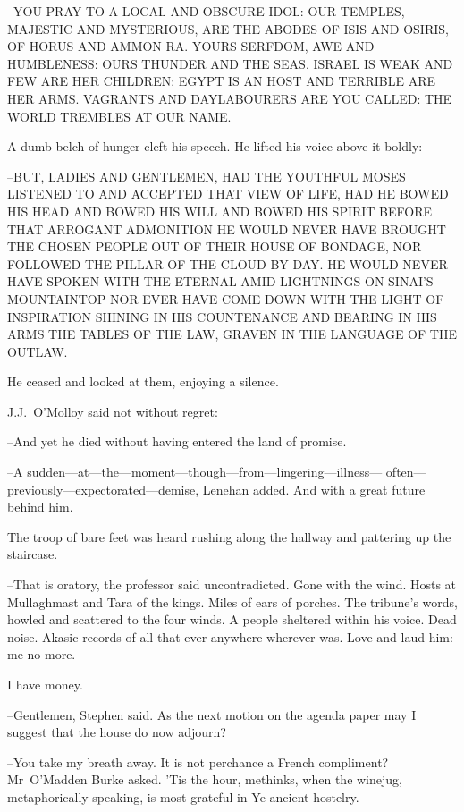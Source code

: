 --YOU PRAY TO A LOCAL AND OBSCURE IDOL:
OUR TEMPLES,
MAJESTIC AND MYSTERIOUS,
ARE THE ABODES OF ISIS AND OSIRIS,
OF HORUS AND AMMON RA.
YOURS SERFDOM, AWE AND HUMBLENESS:
OURS THUNDER AND THE SEAS.
ISRAEL IS WEAK AND FEW ARE HER CHILDREN:
EGYPT IS AN HOST AND TERRIBLE ARE HER ARMS.
VAGRANTS AND DAYLABOURERS ARE YOU CALLED:
THE WORLD TREMBLES AT OUR NAME.

A dumb belch of hunger cleft his speech.
He lifted his voice above it boldly:

--BUT, LADIES AND GENTLEMEN,
HAD THE YOUTHFUL MOSES LISTENED TO AND ACCEPTED THAT VIEW OF LIFE,
HAD HE BOWED HIS HEAD AND BOWED HIS WILL AND
BOWED HIS SPIRIT BEFORE THAT ARROGANT ADMONITION
HE WOULD NEVER HAVE BROUGHT THE CHOSEN PEOPLE OUT OF THEIR HOUSE OF BONDAGE,
NOR FOLLOWED THE PILLAR OF THE CLOUD BY DAY.
HE WOULD NEVER HAVE SPOKEN WITH THE ETERNAL
AMID LIGHTNINGS ON SINAI'S MOUNTAINTOP
NOR EVER HAVE COME DOWN WITH THE LIGHT OF INSPIRATION SHINING IN HIS COUNTENANCE
AND BEARING IN HIS ARMS THE TABLES OF THE LAW,
GRAVEN IN THE LANGUAGE OF THE OUTLAW.

He ceased and looked at them, enjoying a silence.



J.J.~O'Molloy said
not without regret:

--And yet he died
without having entered the land of promise.

--A sudden---at---the---moment---though---from---lingering---illness---%
often---previously---expectorated---demise,
Lenehan added.
And with a great future behind him.

The troop of bare feet was heard rushing along the hallway
and pattering up the staircase.

--That is oratory,
the professor said uncontradicted.
Gone with the wind.
Hosts at Mullaghmast and Tara of the kings.
Miles of ears of porches.
The tribune's words,
howled and scattered to the four winds.
A people sheltered within his voice.
Dead noise.
Akasic records of all that ever anywhere wherever was.
Love and laud him: me no more.

I have money.

--Gentlemen,
Stephen said.
As the next motion on the agenda paper
may I suggest that the house do now adjourn?

--You take my breath away.
It is not perchance a French compliment?
Mr~O'Madden Burke asked.
'Tis the hour,
methinks,
when the winejug,
metaphorically speaking,
is most grateful in Ye ancient hostelry.

